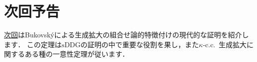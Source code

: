 \documentclass[a4j,leqno]{ltjsarticle}
\newcommand{\sDDG}{\mathord{\mathrm{sDDG}}}
\begin{document}
\section*{次回予告}
\href{http://konn-san.com/math/geology-bukovsky-theorem.html}{次回}はBukovsk\'{y}による生成拡大の組合せ論的特徴付けの現代的な証明を紹介します．
この定理は$\sDDG$の証明の中で重要な役割を果し，また$\kappa$-c.c.\ 生成拡大に関するある種の一意性定理が従います．

\nocite{Fuchs:2014fj,Usuba:2017fp,Reitz:2007af}
\nocite{Friedman:2016lr,Hamkins:2015uq}
\printbibliography[title=参考文献]
\end{document}
